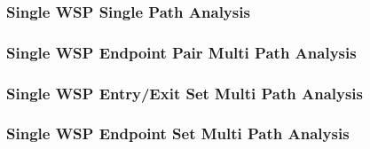 \documentclass{article}
\theoremstyle{definition}
\begin{document}
\subsubsection{Single WSP Single Path Analysis}









\subsubsection{Single WSP Endpoint Pair Multi Path Analysis}















\subsubsection{Single WSP Entry/Exit Set Multi Path Analysis}















\subsubsection{Single WSP Endpoint Set Multi Path Analysis}
\end{document}
